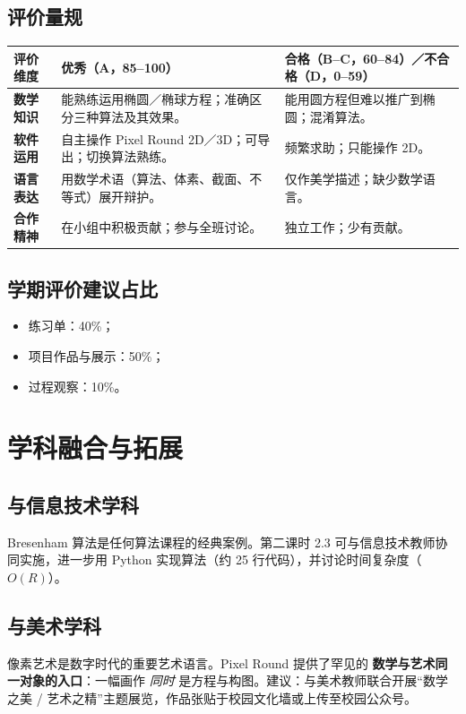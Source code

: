 \documentclass[12pt,a4paper]{scrartcl}
\newcommand{\acc}[1]{\textcolor{accent}{\textbf{#1}}}
\begin{document}
\subsection{评价量规}

\begin{center}
\small
\begin{tabularx}{\textwidth}{@{}p{}XX@{}}
\toprule
\textbf{评价维度} & \textbf{优秀（A，85--100）} & \textbf{合格（B--C，60--84）／不合格（D，0--59）} \\
\midrule
\textbf{数学知识} & 能熟练运用椭圆／椭球方程；准确区分三种算法及其效果。 & 能用圆方程但难以推广到椭圆；混淆算法。 \\
\addlinespace[3pt]
\textbf{软件运用} & 自主操作 Pixel Round 2D／3D；可导出；切换算法熟练。 & 频繁求助；只能操作 2D。 \\
\addlinespace[3pt]
\textbf{语言表达} & 用数学术语（算法、体素、截面、不等式）展开辩护。 & 仅作美学描述；缺少数学语言。 \\
\addlinespace[3pt]
\textbf{合作精神} & 在小组中积极贡献；参与全班讨论。 & 独立工作；少有贡献。 \\
\bottomrule
\end{tabularx}
\end{center}

\subsection{学期评价建议占比}
\begin{itemize}[leftmargin=1.3em,itemsep=0.1em,topsep=0.2em,nosep]
  \item 练习单：40\%；
  \item 项目作品与展示：50\%；
  \item 过程观察：10\%。
\end{itemize}

\section{学科融合与拓展}

\subsection{与信息技术学科}
Bresenham 算法是任何算法课程的经典案例。第二课时 2.3 可与信息技术教师协同实施，进一步用 Python 实现算法（约 25 行代码），并讨论时间复杂度（$O(R)$）。

\subsection{与美术学科}
像素艺术是数字时代的重要艺术语言。Pixel Round 提供了罕见的 \acc{数学与艺术同一对象的入口}：一幅画作 \emph{同时} 是方程与构图。建议：与美术教师联合开展“数学之美 / 艺术之精”主题展览，作品张贴于校园文化墙或上传至校园公众号。
\end{document}
